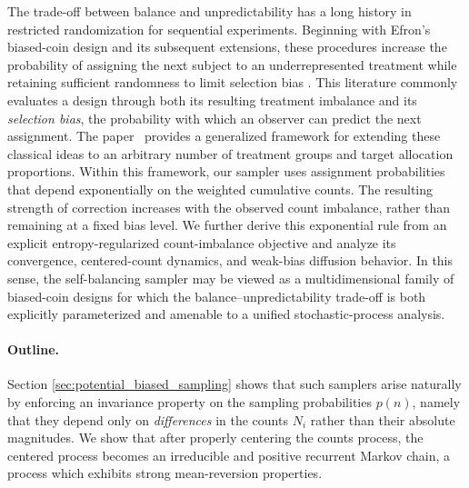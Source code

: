The trade-off between balance and unpredictability has a long history in restricted randomization
for sequential experiments. Beginning with Efron's biased-coin design and its subsequent extensions, these procedures
increase the probability of assigning the next subject to an underrepresented treatment while retaining sufficient
randomness to limit selection bias \cite{efron1971_forcing_sequential_experiment_balanced,smith1984_sequential_treatment_allocation_biased_coin,atkinson2002_sequential_clinical_trials_covariate_information,antognini2004_adjustable_biased_coin_design,markaryan2010_efron_biased_coin_exact_properties}.
This literature commonly evaluates a design through both its resulting treatment imbalance and its \textit{selection bias},
the probability with which an observer can predict the next assignment. The paper~\cite{hu2016_generalized_efron_biased_coin}
provides a generalized framework for extending these classical ideas to an arbitrary number of treatment groups and target allocation proportions.
Within this framework, our sampler uses assignment probabilities that depend
 exponentially on the weighted cumulative counts. The resulting strength of correction increases with the observed
 count imbalance, rather than remaining at a fixed bias level. We further derive this exponential rule from an explicit
  entropy-regularized count-imbalance objective and analyze its convergence, centered-count dynamics, and weak-bias
  diffusion behavior. In this sense, the self-balancing sampler may be viewed as a multidimensional family of
   biased-coin designs for which the balance--unpredictability trade-off is both explicitly parameterized and
   amenable to a unified stochastic-process analysis.

\paragraph*{Outline.}
Section \ref{sec:potential_biased_sampling} shows that such samplers arise naturally by enforcing an 
invariance property on the sampling probabilities $p(n)$, namely that they depend only on
\emph{differences} in the counts $N_i$ rather than their absolute magnitudes. We show that after properly 
centering the counts process, the centered process becomes an irreducible and positive recurrent Markov chain, 
a process which exhibits strong mean-reversion properties.

